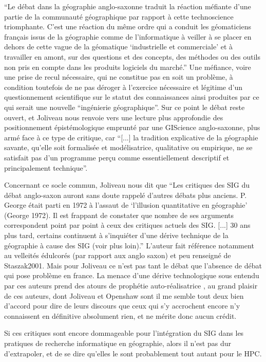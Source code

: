 \enquote{Le débat dans la géographie anglo-saxonne traduit la réaction méfiante d'une partie de la communauté géographique par rapport à cette technoscience triomphante. C'est une réaction du même ordre qui a conduit les géomaticiens français issus de la géographie comme de l'informatique à veiller à se placer en dehors de cette vague de la géomatique \enquote{industrielle et commerciale} et à travailler en amont, sur des questions et des concepts, des méthodes ou des outils non pris en compte dans les produits logiciels du marché.} Une méfiance, voire une prise de recul nécessaire, qui ne constitue pas en soit un problème, à condition toutefois de ne pas déroger à l'exercice nécessaire et légitime d'un questionnement scientifique sur le statut des connaissances ainsi produites par ce qui serait une nouvelle \enquote{ingénierie géographique}. Sur ce point le débat reste ouvert, et Joliveau nous renvoie vers une lecture plus approfondie des positionnement épistémologique emprunté par une GIScience anglo-saxonne, plus armé face à ce type de critique, car \enquote{[...] la tradition explicative de la géographie savante, qu'elle soit formalisée et modélisatrice, qualitative ou empirique, ne se satisfait pas d'un programme perçu comme essentiellement descriptif et principalement technique}.\autocite[475-477]{Joliveau2004}

Concernant ce socle commun, Joliveau nous dit que \enquote{Les critiques des SIG du débat anglo-saxon auront sans doute rappelé d'autres débats plus anciens. P. George était parti en 1972 à l'assaut de \enquote{l'illusion quantitative en géographie} (George 1972). Il est frappant de constater que nombre de ses arguments correspondent point par point à ceux des critiques actuels des SIG. [...] 30 ans plus tard, certains continuent à s'inquiéter d'une dérive technique de la géographie à cause des SIG (voir plus loin).} \autocite[477]{Joliveau2004} L'auteur fait référence notamment au velleités édulcorés (par rapport aux anglo saxon) et peu renseigné de Staszak2001. Mais pour Joliveau ce n'est pas tant le débat que l'absence de débat qui pose problème en france. La menace d'une dérive technologique sous entendu par ces auteurs prend des atours de prophétie auto-réalisatrice , au grand plaisir de ces auteurs, dont Joliveau  et Openshaw sont il me semble tout deux bien d'accord pour dire de leurs discours que ceux qui s'y accrochent encore n'y connaissent en définitive absolument rien, et ne mérite donc aucun crédit.

Si ces critiques sont encore dommageable pour l'intégration du SIG dans les pratiques de recherche informatique en géographie, alors il n'est pas dur d'extrapoler, et de se dire qu'elles le sont probablement tout autant pour le HPC.

